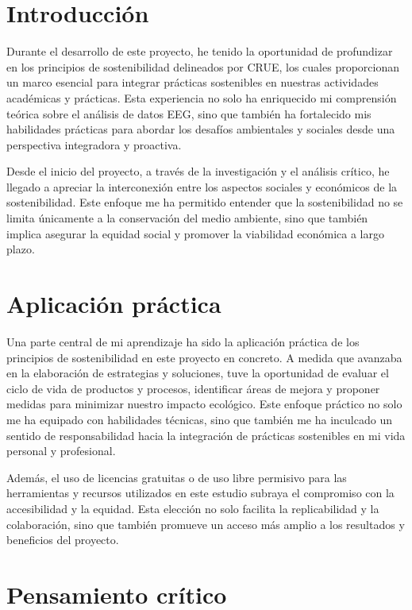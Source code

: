 
\section{Introducción}


Durante el desarrollo de este proyecto, he tenido la oportunidad de profundizar en los principios de sostenibilidad delineados por CRUE, los cuales proporcionan un marco esencial para integrar prácticas sostenibles en nuestras actividades académicas y prácticas. Esta experiencia no solo ha enriquecido mi comprensión teórica sobre el análisis de datos EEG, sino que también ha fortalecido mis habilidades prácticas para abordar los desafíos ambientales y sociales desde una perspectiva integradora y proactiva.


Desde el inicio del proyecto, a través de la investigación y el análisis crítico, he llegado a apreciar la interconexión entre los aspectos sociales y económicos de la sostenibilidad. Este enfoque me ha permitido entender que la sostenibilidad no se limita únicamente a la conservación del medio ambiente, sino que también implica asegurar la equidad social y promover la viabilidad económica a largo plazo.



\section{Aplicación práctica}

Una parte central de mi aprendizaje ha sido la aplicación práctica de los principios de sostenibilidad en este proyecto en concreto. A medida que avanzaba en la elaboración de estrategias y soluciones, tuve la oportunidad de evaluar el ciclo de vida de productos y procesos, identificar áreas de mejora y proponer medidas para minimizar nuestro impacto ecológico. Este enfoque práctico no solo me ha equipado con habilidades técnicas, sino que también me ha inculcado un sentido de responsabilidad hacia la integración de prácticas sostenibles en mi vida personal y profesional.

Además, el uso de licencias gratuitas o de uso libre permisivo para las herramientas y recursos utilizados en este estudio subraya el compromiso con la accesibilidad y la equidad. Esta elección no solo facilita la replicabilidad y la colaboración, sino que también promueve un acceso más amplio a los resultados y beneficios del proyecto.

\section{Pensamiento crítico}

